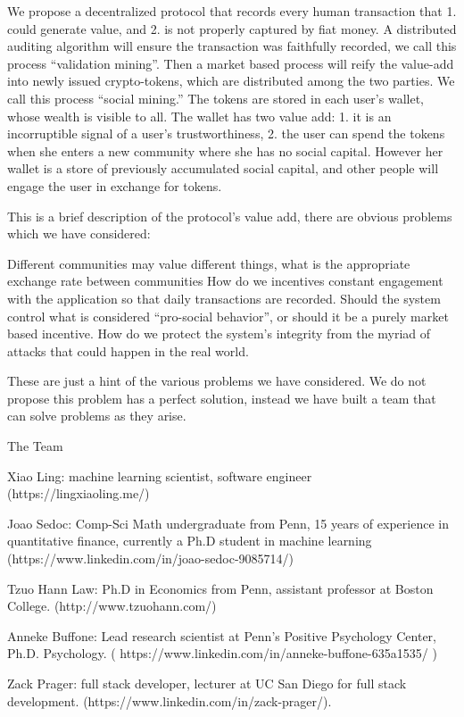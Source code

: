 We propose a decentralized protocol that records every human transaction that 1. could generate value, and 2. is not properly captured by fiat money.  A distributed auditing algorithm will ensure the transaction was faithfully recorded, we call this process “validation mining”.  Then a market based process will reify the value-add into newly issued crypto-tokens, which are distributed among the two parties. We call this process “social mining.” The tokens are stored in each user’s wallet, whose wealth is visible to all. The wallet has two value add: 1. it is an incorruptible signal of a user’s trustworthiness, 2. the user can spend the tokens when she enters a new community where she has no social capital. However her wallet is a store of previously accumulated social capital, and other people will engage the user in exchange for tokens. 

This is a brief description of the protocol’s value add, there are obvious problems which we have considered:

Different communities may value different things, what is the appropriate exchange rate between communities 
How do we incentives constant engagement with the application so that daily transactions are recorded.
Should the system control what is considered “pro-social behavior”, or should it be a purely market based incentive. 
How do we protect the system’s integrity from the myriad of attacks that could happen in the real world.

These are just a hint of the various problems we have considered. We do not propose this problem has a perfect solution, instead we have built a team that can solve problems as they arise. 

The Team

Xiao Ling: machine learning scientist, software engineer (https://lingxiaoling.me/)

Joao Sedoc: Comp-Sci Math undergraduate from Penn, 15 years of experience in quantitative finance, currently a Ph.D student in machine learning (https://www.linkedin.com/in/joao-sedoc-9085714/)

Tzuo Hann Law: Ph.D in Economics from Penn, assistant professor at Boston College. (http://www.tzuohann.com/)

Anneke Buffone: Lead research scientist at Penn’s Positive Psychology Center, Ph.D. Psychology. ( https://www.linkedin.com/in/anneke-buffone-635a1535/ )

Zack Prager: full stack developer, lecturer at UC San Diego for full stack development. (https://www.linkedin.com/in/zack-prager/). 

